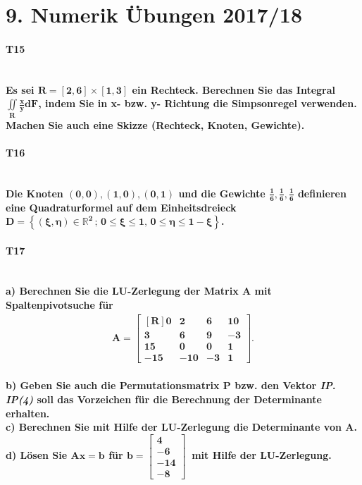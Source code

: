 \documentclass[10pt,a4paper]{article}
\begin{document}
	\section*{9. Numerik Übungen 2017/18}
	\paragraph{T15}\mbox{}\\
	\textbf{%
		Es sei $\mathbf{R = [2,6]\times[1,3]}$ ein Rechteck. Berechnen Sie das Integral $\mathbf{\iint\limits_R\frac{x}{y}dF}$, indem Sie in x- bzw. y- Richtung die Simpsonregel verwenden. Machen Sie auch eine Skizze (Rechteck, Knoten, Gewichte).
	}\\


	\paragraph{T16}\mbox{}\\
	\textbf{%
	Die Knoten $\mathbf{(0,0), (1,0), (0,1)}$ und die Gewichte $\mathbf{\frac{1}{6},\frac{1}{6},\frac{1}{6}}$ definieren eine Quadraturformel auf dem Einheitsdreieck $\mathbf{D=\left\lbrace (\xi,\eta) \in \mathbb{R}^2 \,;\, 0\leq\xi\leq 1,\, 0\leq\eta \leq1-\xi \right\rbrace}$.
	}

	\paragraph{T17}\mbox{}\\
	\textbf{%
		a) Berechnen Sie die LU-Zerlegung der Matrix A mit Spaltenpivotsuche für
		\begin{align*}\mathbf{
			A= \begin{bmatrix*}[R]
				0   & 2   & 6  & 10 \\
				3   & 6   & 9  & -3 \\
				15  & 0   & 0  & 1  \\
				-15 & -10 & -3 & 1
			\end{bmatrix*}.}
		\end{align*}
	}\\
	\textbf{%
		b) Geben Sie auch die Permutationsmatrix P bzw. den Vektor \emph{IP}. \emph{IP(4)} soll das Vorzeichen für die Berechnung der Determinante erhalten.
	}\\
	\textbf{%
		c) Berechnen Sie mit Hilfe der LU-Zerlegung die Determinante von A.
	}\\
	\textbf{%
		d) Lösen Sie $\mathbf{Ax=b}$ für $\mathbf{b = \begin{bmatrix} 4 \\ -6 \\ -14  \\ -8 \end{bmatrix}}\,$ mit Hilfe der LU-Zerlegung.
	}
\end{document}
